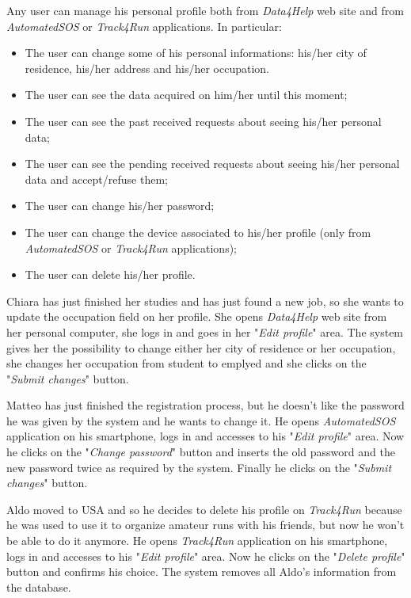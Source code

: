 Any user can manage his personal profile both from \textit{Data4Help} web site and from \textit{AutomatedSOS} or \textit{Track4Run} applications. In particular:
\begin{itemize}
  \item The user can change some of his personal informations: his/her city of residence, his/her address and his/her occupation.
  \item The user can see the data acquired on him/her until this moment;
  \item The user can see the past received requests about seeing his/her personal data;
  \item The user can see the pending received requests about seeing his/her personal data and accept/refuse them;
  \item The user can change his/her password;
  \item The user can change the device associated to his/her profile (only from \textit{AutomatedSOS} or \textit{Track4Run} applications);
  \item The user can delete his/her profile.
\end{itemize}

Chiara has just finished her studies and has just found a new job, so she wants to update the occupation field on her profile. She opens \textit{Data4Help} web site from her personal computer, she logs in and goes in her "\textit{Edit profile}" area. The system gives her the possibility to change either her city of residence or her occupation, she changes her occupation from student to emplyed and she clicks on the "\textit{Submit changes}" button.

Matteo has just finished the registration process, but he doesn't like the password he was given by the system and he wants to change it. He opens \textit{AutomatedSOS} application on his smartphone, logs in and accesses to his "\textit{Edit profile}" area. Now he clicks on the "\textit{Change password}" button and inserts the old password and the new password twice as required by the system. Finally he clicks on the "\textit{Submit changes}" button.

Aldo moved to USA and so he decides to delete his profile on \textit{Track4Run} because he was used to use it to organize amateur runs with his friends, but now he won't be able to do it anymore. He opens \textit{Track4Run} application on his smartphone, logs in and accesses to his "\textit{Edit profile}" area. Now he clicks on the "\textit{Delete profile}" button and confirms his choice. The system removes all Aldo's information from the database.

